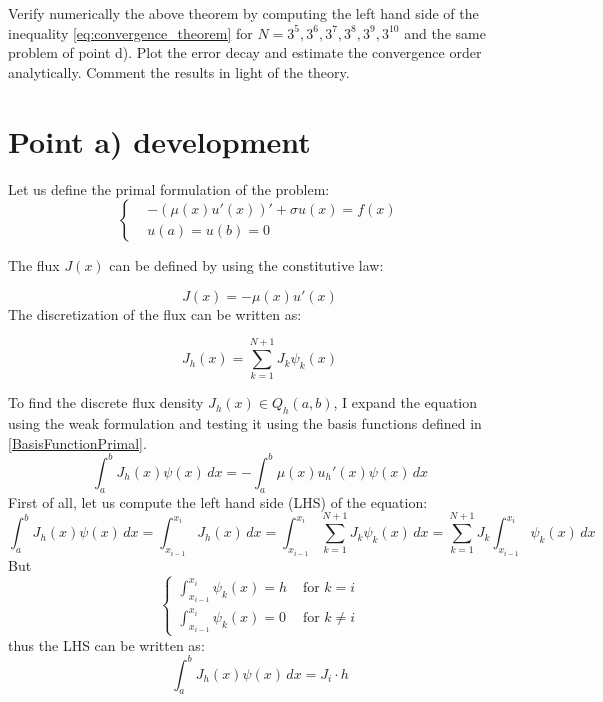\documentclass{article}
\begin{document}
\begin{enumerate}[label=\alph*)]
        Verify numerically the above theorem by computing the left hand side of the inequality 
        \eqref{eq:convergence_theorem} for $N = 3^5, 3^6, 3^7, 3^8, 3^9, 3^{10}$ and the same 
        problem of point d). Plot the error decay and estimate the convergence order analytically. 
        Comment the results in light of the theory.
        \end{enumerate}

\newpage

\section{Point a) development}
Let us define the primal formulation of the problem:
\begin{equation}
    \begin{cases}
        &-(\mu(x)u'(x))' + \sigma u(x) = f(x)\\
        &u(a) = u(b) = 0
    \end{cases}
    \label{eq:primalFormulation}
\end{equation}

The flux $J(x)$ can be defined by using the constitutive law:

\begin{equation*}
    J(x) = - \mu(x) u'(x)
\end{equation*}
The discretization of the flux can be written as:

\begin{equation}
    J_h(x)=\sum_{k=1}^{N+1} J_k \psi_k(x)
    \label{eq:J_hDef}
\end{equation}

To find the discrete flux density $J_h(x) \in Q_h(a,b)$, I expand the equation using the weak formulation and testing it using the basis functions defined in \eqref{BasisFunctionPrimal}. \\
\begin{equation}
    \int_{a}^{b} J_h(x) \psi(x) \, dx = -\int_{a}^{b} \mu(x)u_h'(x) \psi(x) \, dx
    \label{WeakFormA}
\end{equation}
First of all, let us compute the left hand side (LHS) of the equation:
\begin{equation*}
    \int_{a}^{b} J_h(x) \psi(x) \, dx = \int_{x_{i-1}}^{x_i} J_h(x) \, dx =\int_{x_{i-1}}^{x_i} \sum_{k=1}^{N+1} J_k \psi_k(x) \, dx = \sum_{k=1}^{N+1} J_k \int_{x_{i-1}}^{x_i} \psi_k(x) \, dx
\end{equation*}
But
\begin{equation*}
    \begin{cases}
         \int_{x_{i-1}}^{x_i} \psi_k(x) = h &\text{  for } k=i \\
         \int_{x_{i-1}}^{x_i} \psi_k(x) = 0 &\text{  for } k \neq i
    \end{cases}
\end{equation*}
thus the LHS can be written as:
\begin{equation*}
    \int_{a}^{b} J_h(x) \psi(x) \, dx = J_i \cdot h 
\end{equation*}\newline
\end{document}
